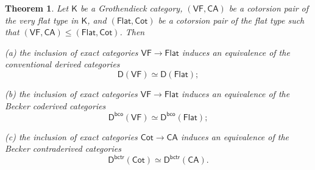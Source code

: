 \documentclass[12pt,a4paper]{amsart}
\newcommand{\+}{\nobreakdash-}
\renewcommand{\:}{\colon}
\newcommand{\rarrow}{\longrightarrow}
\newcommand{\sD}{\mathsf D}
\newcommand{\sK}{\mathsf K}
\newcommand{\VF}{\mathsf{VF}}
\newcommand{\CA}{\mathsf{CA}}
\newcommand{\Flat}{\mathsf{Flat}}
\newcommand{\Cot}{\mathsf{Cot}}
\newcommand{\bco}{\mathsf{bco}}
\newcommand{\bctr}{\mathsf{bctr}}
\theoremstyle{plain}
\newtheorem{thm}{Theorem}[section]
\theoremstyle{definition}
\begin{document}
\begin{thm} \label{flat-type-contraderived-equivalences-theorem}
 Let\/ $\sK$ be a Grothendieck category, $(\VF,\CA)$ be a cotorsion pair
of the very flat type in\/ $\sK$, and $(\Flat,\Cot)$ be a cotorsion pair
of the flat type such that $(\VF,\CA)\le(\Flat,\Cot)$.
 Then \par
\textup{(a)} the inclusion of exact categories\/ $\VF\rarrow\Flat$
induces an equivalence of the conventional derived categories
$$
 \sD(\VF)\simeq\sD(\Flat);
$$ \par
\textup{(b)} the inclusion of exact categories\/ $\VF\rarrow\Flat$
induces an equivalence of the Becker coderived categories
$$
 \sD^\bco(\VF)\simeq\sD^\bco(\Flat);
$$ \par
\textup{(c)} the inclusion of exact categories\/ $\Cot\rarrow\CA$
induces an equivalence of the Becker contraderived categories
$$
 \sD^\bctr(\Cot)\simeq\sD^\bctr(\CA).
$$
\end{thm}
\end{document}
